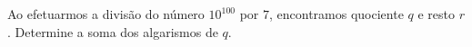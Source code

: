 Ao efetuarmos a divisão do número $10^{100}$ por $7$, encontramos quociente $q$ e resto $r$.
Determine a soma dos algarismos de $q$.
